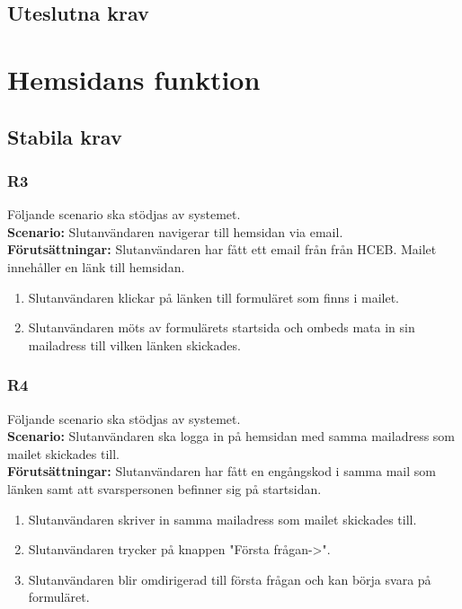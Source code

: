 \documentclass{article}
\begin{document}
    \subsection*{Uteslutna krav}
    
    \section{Hemsidans funktion}
    
    \subsection*{Stabila krav}
    
      \subsubsection*{R3}
    Följande scenario ska stödjas av systemet.
        \\
       \indent \textbf{Scenario:} Slutanvändaren navigerar till hemsidan via email.
        \\
       \indent \textbf{Förutsättningar:} Slutanvändaren har fått ett email från från HCEB. Mailet innehåller en länk till hemsidan.
            \begin{enumerate}
                \item Slutanvändaren klickar på länken till formuläret som finns i mailet.
                \item Slutanvändaren möts av formulärets startsida och ombeds mata in sin mailadress till vilken länken skickades. 
            \end{enumerate}
            
        \subsubsection*{R4}
    Följande scenario ska stödjas av systemet.
        \\
       \indent \textbf{Scenario:} Slutanvändaren ska logga in på hemsidan med samma mailadress som mailet skickades till.
        \\
       \indent \textbf{Förutsättningar:} Slutanvändaren har fått en engångskod i samma mail som länken samt att svarspersonen befinner sig på startsidan.
            \begin{enumerate}
               \item Slutanvändaren skriver in samma mailadress som mailet skickades till.
               \item Slutanvändaren trycker på knappen "Första frågan->".
                \item  Slutanvändaren blir omdirigerad till första frågan och kan börja svara på formuläret.
            \end{enumerate}
   
\end{document}
